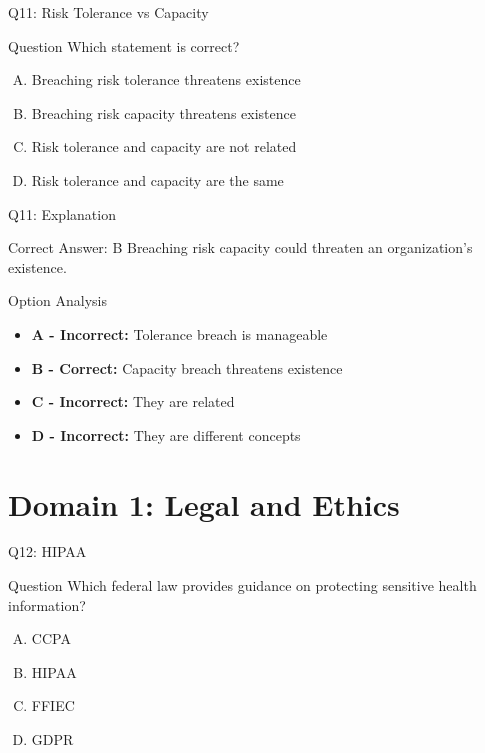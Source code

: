 \documentclass{beamer}
\begin{document}
	
	
	\begin{frame}{Q11: Risk Tolerance vs Capacity}
		\begin{block}{Question}
			Which statement is correct?
		\end{block}
		\begin{enumerate}[(A)]
			\item Breaching risk tolerance threatens existence
			\item Breaching risk capacity threatens existence
			\item Risk tolerance and capacity are not related
			\item Risk tolerance and capacity are the same
		\end{enumerate}
	\end{frame}
	
	\begin{frame}{Q11: Explanation}
		\begin{block}{Correct Answer: B}
			Breaching risk capacity could threaten an organization's existence.
		\end{block}
		\begin{block}{Option Analysis}
			\begin{itemize}
				\item \textbf{A - Incorrect:} Tolerance breach is manageable
				\item \textbf{B - Correct:} Capacity breach threatens existence
				\item \textbf{C - Incorrect:} They are related
				\item \textbf{D - Incorrect:} They are different concepts
			\end{itemize}
		\end{block}
	\end{frame}
	
	\section{Domain 1: Legal and Ethics}
	
	\begin{frame}{Q12: HIPAA}
		\begin{block}{Question}
			Which federal law provides guidance on protecting sensitive health information?
		\end{block}
		\begin{enumerate}[(A)]
			\item CCPA
			\item HIPAA
			\item FFIEC
			\item GDPR
		\end{enumerate}
	\end{frame}
	
\end{document}
